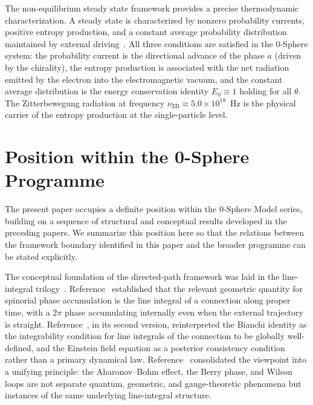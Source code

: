 \documentclass[%
 reprint, amsmath,amssymb, aps, prb, ]{revtex4-2}
\numberwithin{equation}{section}
\begin{document}
The non-equilibrium steady state framework provides a precise thermodynamic characterization. A steady state is characterized by nonzero probability currents, positive entropy production, and a constant average probability distribution maintained by external driving~\cite{Zeh2007}. All three conditions are satisfied in the 0-Sphere system: the probability current is the directional advance of the phase $a$ (driven by the chirality), the entropy production is associated with the net radiation emitted by the electron into the electromagnetic vacuum, and the constant average distribution is the energy conservation identity $E_0 \equiv 1$ holding for all $\theta$. The Zitterbewegung radiation at frequency $\nu_{\mathrm{ZB}} \approx 5.0 \times 10^{18}$~Hz is the physical carrier of the entropy production at the single-particle level.


\section{Position within the 0-Sphere Programme}
\label{sec:position}

The present paper occupies a definite position within the 0-Sphere Model series, building on a sequence of structural and conceptual results developed in the preceding papers. We summarize this position here so that the relations between the framework boundary identified in this paper and the broader programme can be stated explicitly.

The conceptual foundation of the directed-path framework was laid in the line-integral trilogy~\cite{hanamura29, hanamura30, hanamura31}. Reference~\cite{hanamura29} established that the relevant geometric quantity for spinorial phase accumulation is the line integral of a connection along proper time, with a $2\pi$ phase accumulating internally even when the external trajectory is straight. Reference~\cite{hanamura30}, in its second version, reinterpreted the Bianchi identity as the integrability condition for line integrals of the connection to be globally well-defined, and the Einstein field equation as a posterior consistency condition rather than a primary dynamical law. Reference~\cite{hanamura31} consolidated the viewpoint into a unifying principle: the Aharonov--Bohm effect, the Berry phase, and Wilson loops are not separate quantum, geometric, and gauge-theoretic phenomena but instances of the same underlying line-integral structure.
\end{document}
